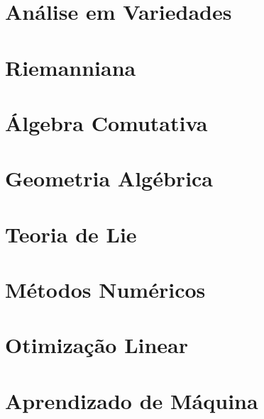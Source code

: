 \documentclass{article}
\begin{document}
\section{Análise em Variedades}

\setcounter{definition}{0}

\section{Riemanniana}

\setcounter{definition}{0}

\section{Álgebra Comutativa}

% 
\setcounter{definition}{0}

\section{Geometria Algébrica}

% 
\setcounter{definition}{0}

\section{Teoria de Lie}

% 
\setcounter{definition}{0}

\section{Métodos Numéricos}

% 
\setcounter{definition}{0}

\section{Otimização Linear}

% 
\setcounter{definition}{0}

\section{Aprendizado de Máquina}

% 
\setcounter{definition}{0}
\end{document}
